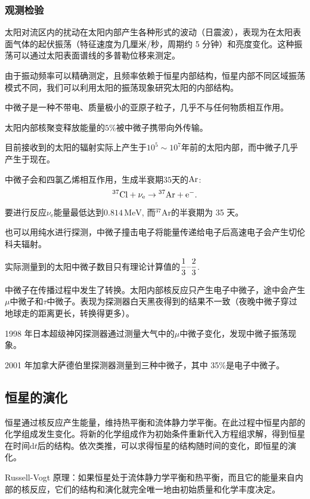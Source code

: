 \documentclass[../天体物理基础.tex]{subfiles}
\begin{document}
\subsubsection{观测检验}
太阳对流区内的扰动在太阳内部产生各种形式的波动（日震波），表现为在太阳表面气体的起伏振荡（特征速度为几厘米/秒，周期约 5 分钟）和亮度变化。这种振荡可以通过太阳表面谱线的多普勒位移来测定。

由于振动频率可以精确测定，且频率依赖于恒星内部结构，恒星内部不同区域振荡模式不同，我们可以利用太阳的振荡现象研究太阳的内部结构。

中微子是一种不带电、质量极小的亚原子粒子，几乎不与任何物质相互作用。

太阳内部核聚变释放能量的$5\%$被中微子携带向外传输。

目前接收到的太阳的辐射实际上产生于$10^{5}\sim10^{7}$年前的太阳内部，而中微子几乎产生于现在。

中微子会和四氯乙烯相互作用，生成半衰期$35$天的$\rm Ar$:
\begin{equation}
{}^{37}\mathrm{Cl}+\nu_{\text{e}}\to{}^{37}\mathrm{Ar}+\mathrm{e}^{-}.\\
\end{equation}
要进行反应$\nu_{\text{e}}$能量最低达到$0.814\,\mathrm{MeV}$, 而${}^{37}\mathrm{Ar}$的半衰期为 35 天。

也可以用纯水进行探测，中微子撞击电子将能量传递给电子后高速电子会产生切伦科夫辐射。

实际测量到的太阳中微子数目只有理论计算值的$\dfrac{1}{3}\text{\textendash}\dfrac{2}{3}$.

中微子在传播过程中发生了转换。太阳内部核反应只产生电子中微子，途中会产生$\mu$中微子和$\tau$中微子。表现为探测器白天黑夜得到的结果不一致（夜晚中微子穿过地球走的距离更长，转换得更多）。

1998 年日本超级神冈探测器通过测量大气中的$\mu$中微子变化，发现中微子振荡现象。

2001 年加拿大萨德伯里探测器测量到三种中微子，其中 35\%是电子中微子。

\subsection{恒星的演化}
恒星通过核反应产生能量，维持热平衡和流体静力学平衡。在此过程中恒星内部的化学组成发生变化。将新的化学组成作为初始条件重新代入方程组求解，得到恒星在时间$\mathrm{d}t$后的结构。依次类推，可以求得恒星的结构随时间的变化，即恒星的演化。

Russell-Vogt 原理：如果恒星处于流体静力学平衡和热平衡，而且它的能量来自内部的核反应，它们的结构和演化就完全唯一地由初始质量和化学丰度决定。
\end{document}
